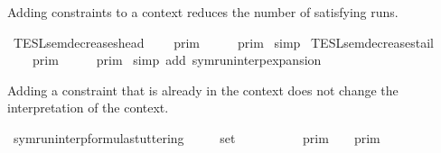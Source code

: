 \begin{isabellebody}
\begin{isamarkuptext}
Adding constraints to a context reduces the number of satisfying runs.%
\end{isamarkuptext}\isamarkuptrue%
\isamarkupfalse%
\ TESL{\isacharunderscore}sem{\isacharunderscore}decreases{\isacharunderscore}head{\isacharcolon}\isanewline
\ \ {\isacartoucheopen}{\isasymlbrakk}{\isasymlbrakk}\ {\isasymGamma}\ {\isasymrbrakk}{\isasymrbrakk}\isactrlsub p\isactrlsub r\isactrlsub i\isactrlsub m\ {\isasymsupseteq}\ {\isasymlbrakk}{\isasymlbrakk}\ {\isasymgamma}\ {\isacharhash}\ {\isasymGamma}\ {\isasymrbrakk}{\isasymrbrakk}\isactrlsub p\isactrlsub r\isactrlsub i\isactrlsub m{\isacartoucheclose}\isanewline
%
\isadelimproof
%
\endisadelimproof
%
\isatagproof
{}\isamarkupfalse%
\ simp%
\endisatagproof
{\isafoldproof}%
%
\isadelimproof
\isanewline
%
\endisadelimproof
\isanewline
{}\isamarkupfalse%
\ TESL{\isacharunderscore}sem{\isacharunderscore}decreases{\isacharunderscore}tail{\isacharcolon}\isanewline
\ \ {\isacartoucheopen}{\isasymlbrakk}{\isasymlbrakk}\ {\isasymGamma}\ {\isasymrbrakk}{\isasymrbrakk}\isactrlsub p\isactrlsub r\isactrlsub i\isactrlsub m\ {\isasymsupseteq}\ {\isasymlbrakk}{\isasymlbrakk}\ {\isasymGamma}\ {\isacharat}\ {\isacharbrackleft}{\isasymgamma}{\isacharbrackright}\ {\isasymrbrakk}{\isasymrbrakk}\isactrlsub p\isactrlsub r\isactrlsub i\isactrlsub m{\isacartoucheclose}\isanewline
%
\isadelimproof
%
\endisadelimproof
%
\isatagproof
{}\isamarkupfalse%
\ {\isacharparenleft}simp\ add{\isacharcolon}\ symrun{\isacharunderscore}interp{\isacharunderscore}expansion{\isacharparenright}%
\endisatagproof
{\isafoldproof}%
%
\isadelimproof
%
\endisadelimproof
%
\begin{isamarkuptext}%
Adding a constraint that is already in the context does not change the
  interpretation of the context.%
\end{isamarkuptext}\isamarkuptrue%
\isamarkupfalse%
\ symrun{\isacharunderscore}interp{\isacharunderscore}formula{\isacharunderscore}stuttering{\isacharcolon}\isanewline
\ \ \ {\isacartoucheopen}{\isasymgamma}\ {\isasymin}\ set\ {\isasymGamma}{\isacartoucheclose}\isanewline
\ \ \ \ \ {\isacartoucheopen}{\isasymlbrakk}{\isasymlbrakk}\ {\isasymgamma}\ {\isacharhash}\ {\isasymGamma}\ {\isasymrbrakk}{\isasymrbrakk}\isactrlsub p\isactrlsub r\isactrlsub i\isactrlsub m\ {\isacharequal}\ {\isasymlbrakk}{\isasymlbrakk}\ {\isasymGamma}\ {\isasymrbrakk}{\isasymrbrakk}\isactrlsub p\isactrlsub r\isactrlsub i\isactrlsub m{\isacartoucheclose}\isanewline
%
\isadelimproof

\end{isabellebody}
